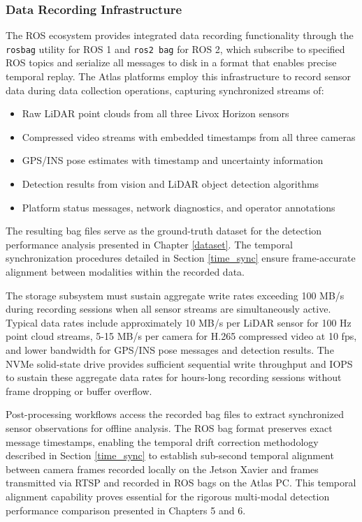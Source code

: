 \subsubsection{Data Recording Infrastructure}

The ROS ecosystem provides integrated data recording functionality through the \texttt{rosbag} utility for ROS 1 and \texttt{ros2 bag} for ROS 2, which subscribe to specified ROS topics and serialize all messages to disk in a format that enables precise temporal replay.
The Atlas platforms employ this infrastructure to record sensor data during data collection operations, capturing synchronized streams of:

\begin{itemize}
\item Raw LiDAR point clouds from all three Livox Horizon sensors
\item Compressed video streams with embedded timestamps from all three cameras
\item GPS/INS pose estimates with timestamp and uncertainty information
\item Detection results from vision and LiDAR object detection algorithms
\item Platform status messages, network diagnostics, and operator annotations
\end{itemize}

The resulting bag files serve as the ground-truth dataset for the detection performance analysis presented in Chapter \ref{dataset}.
The temporal synchronization procedures detailed in Section \ref{time_sync} ensure frame-accurate alignment between modalities within the recorded data.

The storage subsystem must sustain aggregate write rates exceeding 100 MB/s during recording sessions when all sensor streams are simultaneously active.
Typical data rates include approximately 10 MB/s per LiDAR sensor for 100 Hz point cloud streams, 5-15 MB/s per camera for H.265 compressed video at 10 fps, and lower bandwidth for GPS/INS pose messages and detection results.
The NVMe solid-state drive provides sufficient sequential write throughput and IOPS to sustain these aggregate data rates for hours-long recording sessions without frame dropping or buffer overflow.

Post-processing workflows access the recorded bag files to extract synchronized sensor observations for offline analysis.
The ROS bag format preserves exact message timestamps, enabling the temporal drift correction methodology described in Section \ref{time_sync} to establish sub-second temporal alignment between camera frames recorded locally on the Jetson Xavier and frames transmitted via RTSP and recorded in ROS bags on the Atlas PC.
This temporal alignment capability proves essential for the rigorous multi-modal detection performance comparison presented in Chapters 5 and 6.




